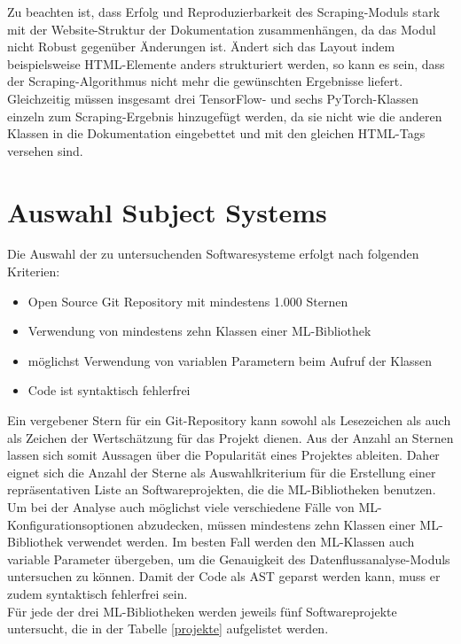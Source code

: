 \documentclass[german,bachelor]{swsLeipzig}
\begin{document}
Zu beachten ist, dass Erfolg und Reproduzierbarkeit des Scraping-Moduls stark mit der Website-Struktur der Dokumentation zusammenhängen,
da das Modul nicht Robust gegenüber Änderungen ist.
Ändert sich das Layout indem beispielsweise HTML-Elemente anders strukturiert werden, so kann es sein, dass der Scraping-Algorithmus nicht mehr die
gewünschten Ergebnisse liefert.
Gleichzeitig müssen insgesamt drei TensorFlow- und sechs PyTorch-Klassen einzeln zum Scraping-Ergebnis hinzugefügt werden,
da sie nicht wie die anderen Klassen in die Dokumentation eingebettet und mit den gleichen HTML-Tags versehen sind.\\

\section{Auswahl Subject Systems}
Die Auswahl der zu untersuchenden Softwaresysteme erfolgt nach folgenden Kriterien:
\begin{itemize}
 \item Open Source Git Repository mit mindestens 1.000 Sternen
 \item Verwendung von mindestens zehn Klassen einer ML-Bibliothek
 \item möglichst Verwendung von variablen Parametern beim Aufruf der Klassen
 \item Code ist syntaktisch fehlerfrei
\end{itemize}

Ein vergebener Stern für ein Git-Repository kann sowohl als Lesezeichen als auch als Zeichen der Wertschätzung für das Projekt dienen.
Aus der Anzahl an Sternen lassen sich somit Aussagen über die Popularität eines Projektes ableiten.
Daher eignet sich die Anzahl der Sterne als Auswahlkriterium für die Erstellung einer repräsentativen Liste an Softwareprojekten, die die
ML-Bibliotheken benutzen.
Um bei der Analyse auch möglichst viele verschiedene Fälle von ML-Konfigurationsoptionen abzudecken, müssen mindestens zehn
Klassen einer ML-Bibliothek verwendet werden.
Im besten Fall werden den ML-Klassen auch variable Parameter übergeben, um die Genauigkeit des Datenflussanalyse-Moduls
untersuchen zu können.
Damit der Code als AST geparst werden kann, muss er zudem syntaktisch fehlerfrei sein.\\

Für jede der drei ML-Bibliotheken werden jeweils fünf Softwareprojekte untersucht, die in der Tabelle \ref{projekte} aufgelistet
werden.\\
\end{document}
